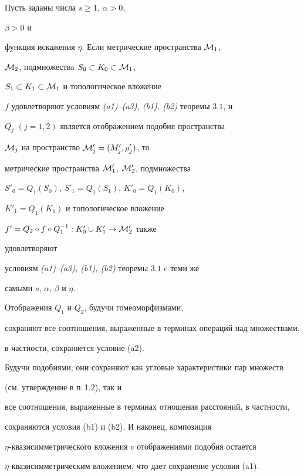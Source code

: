 \begin{lems}


Пусть заданы числа $s \geq 1$, $\alpha > 0$,


$\beta > 0$ и


функция искажения $\eta$. Если метрические пространства ${\cal M}_1$, 


${\cal M}_2$, подмножествa $S_0 \subset K_0 \subset {\cal M}_1$, 


$S_1 \subset K_1 \subset {\cal M}_1$ и топологическое вложение 


$f$ удовлетворяют условиям {\em (a1)--(a3), (b1), (b2)} теоремы $3.1$, и


$Q_j$ $(j=1,2)$ является отображением подобия пространства


${\cal M}_j$ на пространство ${\cal M}'_j=(M'_j, \rho'_j)$, то


метрические пространства ${\cal M}'_1$, ${\cal M}'_2$, подмножества


$S'_0=Q_1(S_0)$, $S'_1=Q_1(S_1)$, $K'_0=Q_1(K_0)$,


$K'_1=Q_1(K_1)$ и топологическое вложение


$f'=Q_2\circ f \circ Q_1^{-1} : K'_0\cup K'_1 \to {\cal M}'_2$ также 


удовлетворяют


условиям {\em (a1)--(a3), (b1), (b2)} теоремы $3.1$ c теми же 


самыми $s$, $\alpha$, $\beta$ и $\eta$.


\end{lems}





\begin{pf}


Отображения $Q_1$ и $Q_2$, будучи гомеоморфизмами, 


сохраняют все соотношения, выраженные в терминах операций над множествами, 


в частности, сохраняется условие (a2). 


Будучи подобиями, они сохраняют как угловые характеристики пар множеств 


(см. утверждение в п.\,1.2), так и 


все соотношения, выраженные в терминах отношения расстояний, в частности, 


сохраняются условия (b1) и (b2).  И наконец, композиция 


$\eta$-{}квазисимметрического вложения c отображениями подобия остается 


$\eta$-{}квазисимметрическим вложением, что дает сохранение условия (a1).


\end{pf}





